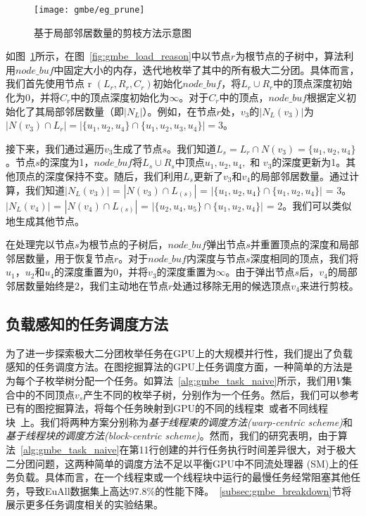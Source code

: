 \begin{figure} [H]
  \center
    \vspace{0.1in}
		\texttt{[image: gmbe/eg\_prune]}
    \vspace{0.1in}
	\caption{基于局部邻居数量的剪枝方法示意图}
	\label{fig:gmbe_prune}
\end{figure}

\begin{example}
  如图~\ref{fig:gmbe_prune}所示，在图~\ref{fig:gmbe_load_reason}中以节点$r$为根节点的子树中，算法利用$node\_buf$中固定大小的内存，迭代地枚举了其中的所有极大二分团。具体而言，我们首先使用节点 r $(L_r, R_r, C_r)$初始化$node\_buf$，将$L_r \cup R_r$中的顶点深度初始化为0，并将$C_r$中的顶点深度初始化为$\infty$。对于$C_r$中的顶点，$node\_buf$根据定义初始化了其局部邻居数量（即$|N_L|$）。例如，在节点$r$处，$v_3$的$|N_L(v_3)|$为$|N(v_3) \cap L_r| = 
  |\{u_1, u_2, u_4\}\cap \{u_1,u_2,u_3,u_4\}| = 3$。

  接下来，我们通过遍历$v_3$生成了节点$s$。我们知道$L_s=L_r\cap N(v_3)=\{u_1, u_2, u_4\}$。节点$s$的深度为1，$node\_buf$将$L_s\cup R_s$中顶点$u_1, u_2, u_4,$ 和 $v_3$的深度更新为1。其他顶点的深度保持不变。随后，我们利用$L_s$更新了$v_3$和$v_4$的局部邻居数量。通过计算，我们知道$|N_L(v_3)|$ = $|N(v_3) \cap L_{(s)}|$
  = $|\{u_1, u_2, u_4\} \cap \{u_1, u_2, u_4\}|$ = 3。
  $|N_L(v_4)|$ = $|N(v_4) \cap L_{(s)}|$
  = $|\{u_2, u_4, u_5\} \cap \{u_1, u_2, u_4\}|$ = 2。我们可以类似地生成其他节点。

在处理完以节点$s$为根节点的子树后，$node\_buf$弹出节点$s$并重置顶点的深度和局部邻居数量，用于恢复节点$r$。对于$node\_buf$内深度与节点$s$深度相同的顶点，我们将$u_1$，$u_2$和$u_4$的深度重置为0，并将$v_3$的深度重置为$\infty$。由于弹出节点$s$后，$v_4$的局部邻居数量始终是2，我们主动地在节点$r$处通过移除无用的候选顶点$v_4$来进行剪枝。


\end{example}


\subsection{负载感知的任务调度方法}
\label{subsec:gmbe_design_load}

为了进一步探索极大二分团枚举任务在GPU上的大规模并行性，我们提出了负载感知的任务调度方法。在图挖掘算法的GPU上任务调度方面，一种简单的方法是为每个子枚举树分配一个任务。如算法~\ref{alg:gmbe_task_naive}所示，我们用$V$集合中的不同顶点$v_s$产生不同的枚举子树，分别作为一个任务。然后，我们可以参考已有的图挖掘算法，将每个任务映射到GPU的不同的线程束~\cite{g2miner22}或者不同线程块~\cite{Kclique22}上。我们将两种方案分别称为\textit{基于线程束的调度方法(warp-centric scheme)}和\textit{基于线程块的调度方法(block-centric scheme)}。然而，我们的研究表明，由于算法~\ref{alg:gmbe_task_naive}在第11行创建的并行任务执行时间差异很大，对于极大二分团问题，这两种简单的调度方法不足以平衡GPU中不同流处理器 (SM)上的任务负载。具体而言，在一个线程束或一个线程块中运行的最慢任务经常阻塞其他任务，导致EuAll数据集上高达97.8\%的性能下降。~\ref{subsec:gmbe_breakdown}节将展示更多任务调度相关的实验结果。

